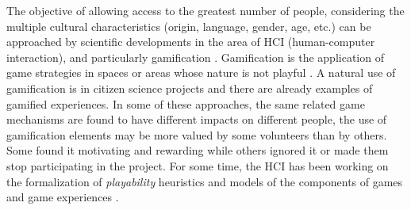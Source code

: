 \documentclass[sigconf]{acmart}
\begin{document}

The objective of allowing access to the greatest number of people, considering the multiple cultural characteristics (origin, language, gender, age, etc.) can be approached by scientific developments in the area of HCI (human-computer interaction), and particularly gamification \cite{Preece2016}. Gamification is the application of game strategies in spaces or areas whose nature is not playful \cite{Deterding2011}. A natural use of gamification is in citizen science projects \cite{Kapp2013} and there are already examples of gamified experiences.  In some of these approaches, the same related game mechanisms are found to have different impacts on different people, the use of gamification elements may be more valued by some volunteers than by others. Some found it motivating and rewarding while others ignored it or made them stop participating in the project. 
For some time, the HCI has been working on the formalization of \textit{playability} heuristics and models of the components of games and game experiences \cite{Deterding2011}.

\end{document}
